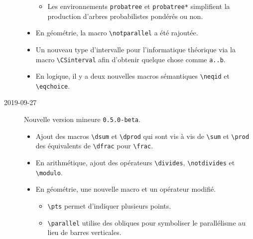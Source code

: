 \documentclass[12pt,a4paper]{article}
\newcommand\env[1]{\texttt{#1}}
\newcommand\macro[1]{\env{\textbackslash{}#1}}
\theoremstyle{definition}
\begin{document}
\begin{description}
\begin{itemize}[itemsep=.5em]
\begin{itemize}[itemsep=.5em]
            \item Les environnements \verb+probatree+ et \verb+probatree*+ simplifient la production d'arbres probabilistes pondérés ou non.
        \end{itemize}
    
    
    
    
        \item En géométrie, la macro \macro{notparallel} a été rajoutée.
    
    
    
    
        \item Un nouveau type d'intervalle pour l'informatique théorique via la macro \macro{CSinterval} afin d'obtenir quelque chose comme \verb+a..b+.
    
    
    
    
        \item En logique, il y a deux nouvelles macros sémantiques \macro{neqid} et \macro{eqchoice}.
    \end{itemize}


    \medskip
    \item[2019-09-27] Nouvelle version mineure \verb+0.5.0-beta+.
    
    \begin{itemize}[itemsep=.5em]
        \item Ajout des macros \macro{dsum} et \macro{dprod} qui sont vis à vis de \macro{sum} et \macro{prod} des équivalents de \macro{dfrac} pour \macro{frac}.
    
    
    
    
        \item En arithmétique, ajout des opérateurs \macro{divides}, \macro{notdivides} et \macro{modulo}.
    
    
    
    
        \item En géométrie, une nouvelle macro et un opérateur modifié.
        \begin{itemize}[itemsep=.5em]
            \item \macro{pts} permet d'indiquer plusieurs points.
    
            \item \macro{parallel} utilise des obliques pour symboliser le parallélisme au lieu de barres verticales.
        \end{itemize}
    

\end{itemize}
\end{description}
\end{document}
